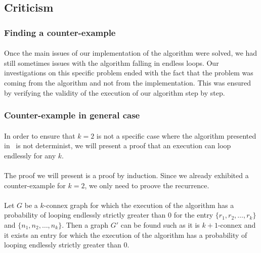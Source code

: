 \subsection{Criticism}
\subsubsection{Finding a counter-example}
\paragraph{}
Once the main issues of our implementation of the algorithm were solved, we
had still sometimes issues with the algorithm falling in endless loops. Our
investigations on this specific problem ended with the fact that the problem was
coming from the algorithm and not from the implementation. This was ensured by
verifying the validity of the execution of our algorithm step by step.



\subsubsection{Counter-example in general case}
\paragraph{}
In order to ensure that $k=2$ is not a specific case where the algorithm
presented in~\cite{JS94} is not determinist, we will present a proof that an
execution can loop endlessly for any $k$.

\paragraph{}
The proof we will present is a proof by induction. Since we already exhibited
a counter-example for $k=2$, we only need to proove the recurrence.

\paragraph{}
Let $G$ be a $k$-connex graph for which the execution of the algorithm has a
probability of looping endlessly strictly greater than $0$ for the entry
$\{r_1,r_2, \dots, r_k\}$ and $\{n_1,n_2, \dots, n_k\}$. Then a graph $G'$ can
be found such as it is $k+1$-connex and it exists an entry for which the
execution of the algorithm has a probability of looping endlessly strictly
greater than $0$.

